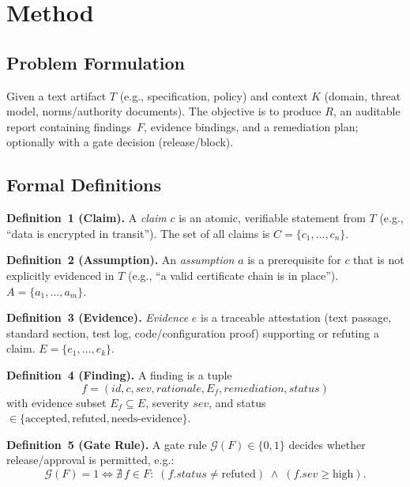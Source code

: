 \documentclass[11pt,a4paper]{article}
\begin{document}
\section{Method}

\subsection{Problem Formulation}
Given a text artifact $T$ (e.g., specification, policy) and context $K$ (domain, threat model, norms/authority documents).
The objective is to produce $R$, an auditable report containing findings~$F$, evidence bindings, and a remediation plan; optionally with a gate decision (release/block).

\subsection{Formal Definitions}

\textbf{Definition~1 (Claim).}
A \emph{claim} $c$ is an atomic, verifiable statement from $T$ (e.g., ``data is encrypted in transit'').
The set of all claims is $C=\{c_1,\dots,c_n\}$.

\textbf{Definition~2 (Assumption).}
An \emph{assumption} $a$ is a prerequisite for $c$ that is not explicitly evidenced in $T$ (e.g., ``a valid certificate chain is in place'').
$A=\{a_1,\dots,a_m\}$.

\textbf{Definition~3 (Evidence).}
\emph{Evidence} $e$ is a traceable attestation (text passage, standard section, test log, code/configuration proof) supporting or refuting a claim.
$E=\{e_1,\dots,e_k\}$.

\textbf{Definition~4 (Finding).}
A finding is a tuple
\[
  f = (\mathit{id}, c, \mathit{sev}, \mathit{rationale}, E_f, \mathit{remediation}, \mathit{status})
\]
with evidence subset $E_f \subseteq E$, severity $\mathit{sev}$, and status $\in \{\text{accepted}, \text{refuted}, \text{needs-evidence}\}$.

\textbf{Definition~5 (Gate Rule).}
A gate rule $\mathcal{G}(F)\in\{0,1\}$ decides whether release/approval is permitted, e.g.:
\[
  \mathcal{G}(F)=1 \iff \nexists\, f\in F:\;(f.\mathit{status}\neq\text{refuted}) \;\land\; (f.\mathit{sev} \ge \text{high}).
\]
\end{document}
